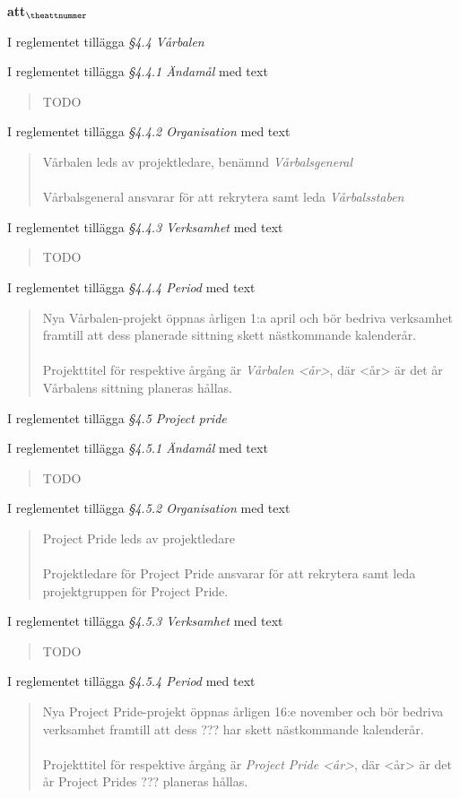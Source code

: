 \documentclass[a4paper]{article}
\begin{document}
\begin{list}{\bf att$_{\theattnummer}$}{}

\item I reglementet tillägga \textit{\S4.4 Vårbalen}
\item I reglementet tillägga \textit{\S4.4.1 Ändamål} med text \begin{quote} TODO \end{quote}
\item I reglementet tillägga \textit{\S4.4.2 Organisation} med text \begin{quote} Vårbalen leds av projektledare, benämnd \textit{Vårbalsgeneral}\\\\Vårbalsgeneral ansvarar för att rekrytera samt leda \textit{Vårbalsstaben}\end{quote}
\item I reglementet tillägga \textit{\S4.4.3 Verksamhet} med text \begin{quote} TODO \end{quote}
\item I reglementet tillägga \textit{\S4.4.4 Period} med text \begin{quote} Nya Vårbalen-projekt öppnas årligen 1:a april och bör bedriva verksamhet framtill att dess planerade sittning skett nästkommande kalenderår.\\\\Projekttitel för respektive årgång är \textit{Vårbalen <år>}, där <år> är det år Vårbalens sittning planeras hållas.\end{quote}


\item I reglementet tillägga \textit{\S4.5 Project pride}
\item I reglementet tillägga \textit{\S4.5.1 Ändamål} med text \begin{quote} TODO \end{quote}
\item I reglementet tillägga \textit{\S4.5.2 Organisation} med text \begin{quote} Project Pride leds av projektledare\\\\Projektledare för Project Pride ansvarar för att rekrytera samt leda projektgruppen för Project Pride.\end{quote}
\item I reglementet tillägga \textit{\S4.5.3 Verksamhet} med text \begin{quote} TODO \end{quote}
\item I reglementet tillägga \textit{\S4.5.4 Period} med text \begin{quote} Nya Project Pride-projekt öppnas årligen 16:e november och bör bedriva verksamhet framtill att dess ??? har skett nästkommande kalenderår.\\\\Projekttitel för respektive årgång är \textit{Project Pride <år>}, där <år> är det år Project Prides ??? planeras hållas.\end{quote}


\end{list}
\end{document}
